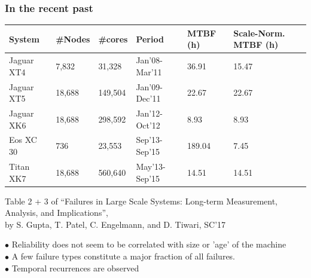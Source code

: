 \begin{frame}
  \frametitle{In the recent past}
  
  \begin{center}
    \begin{tabular}{l|l|l|l|l|l}
      System & \#Nodes & \#cores & Period & MTBF (h) & Scale-Norm. MTBF (h) \\\hline
      Jaguar XT4 & 7,832  & 31,328  & Jan'08-Mar'11 & 36.91 & 15.47 \\\hline
      Jaguar XT5 & 18,688 & 149,504 & Jan'09-Dec'11 & 22.67 & 22.67 \\\hline
      Jaguar XK6 & 18,688 & 298,592 & Jan'12-Oct'12 & 8.93  &  8.93 \\\hline
      Eos XC 30 & 736     & 23,553  & Sep'13-Sep'15 & 189.04 & 7.45 \\\hline
      Titan XK7 & 18,688  & 560,640 & May'13-Sep'15 & 14.51  & 14.51 \\
    \end{tabular}

    \medskip

     Table 2 + 3 of ``Failures in Large Scale Systems: Long-term Measurement, Analysis, and Implications'',\\
    by S. Gupta, T. Patel, C. Engelmann, and D. Tiwari, SC'17
  \end{center}

  \bigskip

  \noindent$\bullet$ Reliability does not seem to be correlated with size or 'age' of the machine\\
  $\bullet$ A few failure types constitute a major fraction of all failures.\\
  $\bullet$ Temporal recurrences are observed
  
\end{frame}

